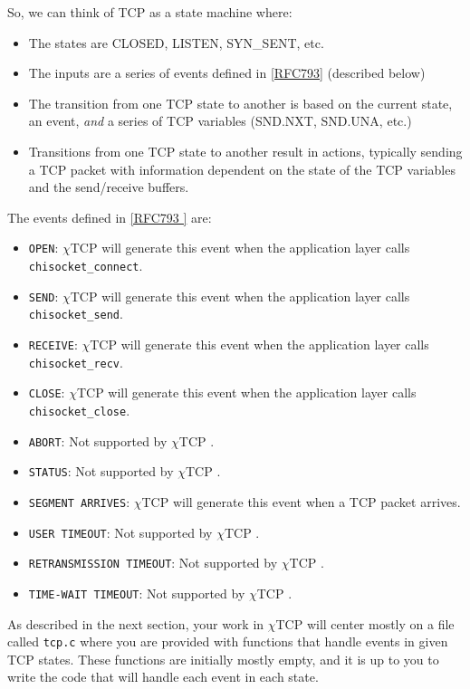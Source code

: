 \documentclass[10pt]{article}
\newcommand{\chitcp}{$\chi$\textsf{TCP} }
\newcommand{\RFC}[1]{\href{http://tools.ietf.org/html/rfc#1}{[RFC#1]}}
\newcommand{\RFCsection}[2]{\href{http://tools.ietf.org/html/rfc#1\#section-#2}{[RFC#1 \textsection #2]}}
\begin{document}
So, we can think of TCP as a state machine where:

\begin{itemize}
 \item The states are CLOSED, LISTEN, SYN\_SENT, etc.
 \item The inputs are a series of events defined in \RFC{793} (described below)
 \item The transition from one TCP state to another is based on the current state, an event, \emph{and} a series of TCP variables (SND.NXT, SND.UNA, etc.)
 \item Transitions from one TCP state to another result in actions, typically sending a TCP packet with information dependent on the state of the TCP variables and the send/receive buffers.
\end{itemize}

The events defined in \RFCsection{793}{3.9} are:

\begin{itemize}
 \item \texttt{OPEN}: \chitcp will generate this event when the application layer calls \texttt{chisocket\_connect}.
 \item \texttt{SEND}: \chitcp will generate this event when the application layer calls \texttt{chisocket\_send}.
 \item \texttt{RECEIVE}: \chitcp will generate this event when the application layer calls \texttt{chisocket\_recv}.
 \item \texttt{CLOSE}: \chitcp will generate this event when the application layer calls \texttt{chisocket\_close}.
 \item \texttt{ABORT}: Not supported by \chitcp.
 \item \texttt{STATUS}: Not supported by \chitcp.
 \item \texttt{SEGMENT ARRIVES}: \chitcp will generate this event when a TCP packet arrives.
 \item \texttt{USER TIMEOUT}: Not supported by \chitcp.
 \item \texttt{RETRANSMISSION TIMEOUT}: Not supported by \chitcp.
 \item \texttt{TIME-WAIT TIMEOUT}: Not supported by \chitcp.
\end{itemize}

As described in the next section, your work in \chitcp will center mostly on a file called \texttt{tcp.c} where you are provided with functions that handle events in given TCP states. These functions are initially mostly empty, and it is up to you to write the code that will handle each event in each state.
\end{document}
